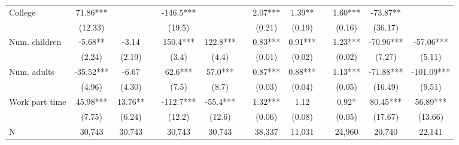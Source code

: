 \begin{landscape}
\begin{center}
\begin{threeparttable}
\begin{footnotesize}
\begin{tabular}{lcccccccccccc}
\;\;\;College        &       71.86***&               &&      -146.5***&               &&       2.07***&        1.39** &&        1.60***&      -73.87** &               \\
                     &     (12.33)   &               &&      (19.5)   &               &&     (0.21)   &      (0.19)   &&      (0.16)   &     (36.17)   &               \\
Num. children        &       -5.68** &       -3.14   &&       150.4***&       122.8***&&       0.83***&        0.91***&&        1.23***&      -70.96***&      -57.06***\\
                     &      (2.24)   &      (2.19)   &&       (3.4)   &       (4.4)   &&     (0.01)   &      (0.02)   &&      (0.02)   &      (7.27)   &      (5.11)   \\
Num. adults          &      -35.52***&       -6.67   &&        62.6***&        57.0***&&       0.87***&        0.88***&&        1.13***&      -71.88***&     -101.09***\\
                     &      (4.96)   &      (4.30)   &&       (7.5)   &       (8.7)   &&     (0.03)   &      (0.04)   &&      (0.05)   &     (16.49)   &      (9.51)   \\
Work part time       &       45.98***&       13.76** &&      -112.7***&       -55.4***&&       1.32***&        1.12   &&        0.92*  &       80.45***&       56.89***\\
                     &      (7.75)   &      (6.24)   &&      (12.2)   &      (12.6)   &&     (0.06)   &      (0.08)   &&      (0.05)   &     (17.67)   &     (13.66)   \\
N                    &       30,743  &       30,743  &&       30,743  &       30,743  &&      38,337  &       11,031  &&       24,960  &       20,740  &       22,141  \\\hline\hline
\end{tabular}
\end{footnotesize}
\end{threeparttable}
\end{center}
\end{landscape}

